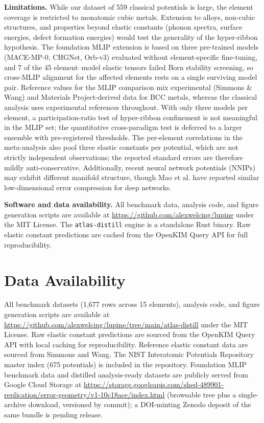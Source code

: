 \documentclass[twocolumn,10pt]{article}
\begin{document}
\textbf{Limitations.} While our dataset of 559 classical potentials is large, the element coverage is restricted to monatomic cubic metals. Extension to alloys, non-cubic structures, and properties beyond elastic constants (phonon spectra, surface energies, defect formation energies) would test the generality of the hyper-ribbon hypothesis. The foundation MLIP extension is based on three pre-trained models (MACE-MP-0, CHGNet, Orb-v3) evaluated without element-specific fine-tuning, and 7 of the 45 element--model elastic tensors failed Born stability screening, so cross-MLIP alignment for the affected elements rests on a single surviving model pair. Reference values for the MLIP comparison mix experimental (Simmons \& Wang) and Materials Project-derived data for BCC metals, whereas the classical analysis uses experimental references throughout. With only three models per element, a participation-ratio test of hyper-ribbon confinement is not meaningful in the MLIP set; the quantitative cross-paradigm test is deferred to a larger ensemble with pre-registered thresholds\cite{welcing2026projection}. The per-element correlations in the meta-analysis also pool three elastic constants per potential, which are not strictly independent observations; the reported standard errors are therefore mildly anti-conservative. Additionally, recent neural network potentials (NNIPs) may exhibit different manifold structure, though Mao et al.\cite{mao2024,mao2026} have reported similar low-dimensional error compression for deep networks.

\textbf{Software and data availability.} All benchmark data, analysis code, and figure generation scripts are available at \url{https://github.com/alexwelcing/lupine} under the MIT License. The \texttt{atlas-distill} engine is a standalone Rust binary. Raw elastic constant predictions are cached from the OpenKIM Query API for full reproducibility.

\section*{Data Availability}

All benchmark datasets (1,677 rows across 15 elements), analysis code, and figure generation scripts are available at \url{https://github.com/alexwelcing/lupine/tree/main/atlas-distill} under the MIT License. Raw elastic constant predictions are sourced from the OpenKIM Query API\cite{openkim} with local caching for reproducibility. Reference elastic constant data are sourced from Simmons and Wang\cite{simmons1971}. The NIST Interatomic Potentials Repository master index (675 potentials) is included in the repository. Foundation MLIP benchmark data and distilled analysis-ready datasets are publicly served from Google Cloud Storage at \url{https://storage.googleapis.com/shed-489901-replication/error-geometry/v1-10c18ace/index.html} (browsable tree plus a single-archive download, versioned by commit); a DOI-minting Zenodo deposit of the same bundle is pending release.
\end{document}
